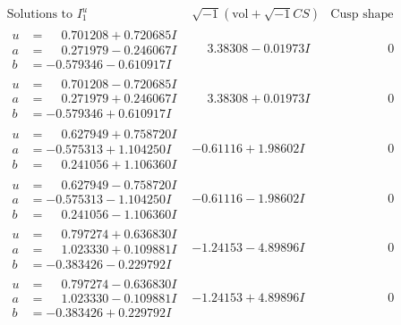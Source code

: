 \documentclass[1p]{elsarticle_modified}
\theoremstyle{definition}
\newcommand{\I}{\sqrt{-1}}
\begin{document}
$$\begin{array}{c|c|c}  
\text{Solutions to }I^u_{1}& \I (\text{vol} + \sqrt{-1}CS) & \text{Cusp shape}\\
 \hline 
\begin{aligned}
u &= \phantom{-}0.701208 + 0.720685 I \\
a &= \phantom{-}0.271979 - 0.246067 I \\
b &= -0.579346 - 0.610917 I\end{aligned}
 & \phantom{-}3.38308 - 0.01973 I & \phantom{-0.000000 } 0 \\ \hline\begin{aligned}
u &= \phantom{-}0.701208 - 0.720685 I \\
a &= \phantom{-}0.271979 + 0.246067 I \\
b &= -0.579346 + 0.610917 I\end{aligned}
 & \phantom{-}3.38308 + 0.01973 I & \phantom{-0.000000 } 0 \\ \hline\begin{aligned}
u &= \phantom{-}0.627949 + 0.758720 I \\
a &= -0.575313 + 1.104250 I \\
b &= \phantom{-}0.241056 + 1.106360 I\end{aligned}
 & -0.61116 + 1.98602 I & \phantom{-0.000000 } 0 \\ \hline\begin{aligned}
u &= \phantom{-}0.627949 - 0.758720 I \\
a &= -0.575313 - 1.104250 I \\
b &= \phantom{-}0.241056 - 1.106360 I\end{aligned}
 & -0.61116 - 1.98602 I & \phantom{-0.000000 } 0 \\ \hline\begin{aligned}
u &= \phantom{-}0.797274 + 0.636830 I \\
a &= \phantom{-}1.023330 + 0.109881 I \\
b &= -0.383426 - 0.229792 I\end{aligned}
 & -1.24153 - 4.89896 I & \phantom{-0.000000 } 0 \\ \hline\begin{aligned}
u &= \phantom{-}0.797274 - 0.636830 I \\
a &= \phantom{-}1.023330 - 0.109881 I \\
b &= -0.383426 + 0.229792 I\end{aligned}
 & -1.24153 + 4.89896 I & \phantom{-0.000000 } 0 \\ \hline\begin{aligned}

\end{aligned}
\end{array}$$
\end{document}

